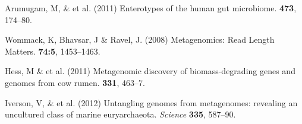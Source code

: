 \documentclass{pnastwo}
\begin{document}
\begin{article}
\begin{thebibliography}{10}

 Arumugam, M, \& et al. \newblock (2011) Enterotypes of
the human gut microbiome.  {\bf 473}, 174--80.

 Wommack, K, Bhavsar, J \& Ravel, J. \newblock (2008) Metagenomics: Read Length Matters.  {\bf 74:5}, 1453--1463.




 Hess, M \& et al. \newblock
(2011) Metagenomic discovery of biomass-degrading genes and genomes from cow
rumen.  {\bf 331}, 463--7.



 Iverson, V, \& et al. \newblock (2012) Untangling genomes from
metagenomes: revealing an uncultured class of marine euryarchaeota. \newblock
{\em Science} {\bf 335}, 587--90.


\end{thebibliography}
\end{article}
\end{document}
